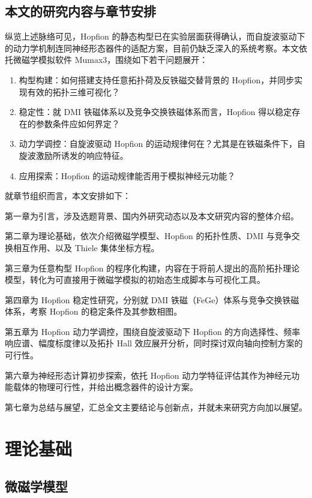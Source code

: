 \documentclass{article}
\begin{document}
\section{本文的研究内容与章节安排}

纵览上述脉络可见，Hopfion 的静态构型已在实验层面获得确认，而自旋波驱动下的动力学机制连同神经形态器件的适配方案，目前仍缺乏深入的系统考察。本文依托微磁学模拟软件 Mumax3，围绕如下若干问题展开：

\begin{enumerate}[label=(\arabic*)]
  \item 构型构建：如何搭建支持任意拓扑荷及反铁磁交替背景的 Hopfion，并同步实现有效的拓扑三维可视化？
  \item 稳定性：就 DMI 铁磁体系以及竞争交换铁磁体系而言，Hopfion 得以稳定存在的参数条件应如何界定？
  \item 动力学调控：自旋波驱动 Hopfion 的运动规律何在？尤其是在铁磁条件下，自旋波激励所诱发的响应特征。
  \item 应用探索：Hopfion 的运动规律能否用于模拟神经元功能？
\end{enumerate}

就章节组织而言，本文安排如下：

第一章为引言，涉及选题背景、国内外研究动态以及本文研究内容的整体介绍。

第二章为理论基础，依次介绍微磁学模型、Hopfion 的拓扑性质、DMI 与竞争交换相互作用、以及 Thiele 集体坐标方程。

第三章为任意构型 Hopfion 的程序化构建，内容在于将前人提出的高阶拓扑理论模型，转化为可直接用于微磁学模拟的初始态生成脚本与可视化工具。

第四章为 Hopfion 稳定性研究，分别就 DMI 铁磁（FeGe）体系与竞争交换铁磁体系，考察 Hopfion 的稳定条件及其参数相图。

第五章为 Hopfion 动力学调控，围绕自旋波驱动下 Hopfion 的方向选择性、频率响应谱、幅度标度律以及拓扑 Hall 效应展开分析，同时探讨双向轴向控制方案的可行性。

第六章为神经形态计算初步探索，依托 Hopfion 动力学特征评估其作为神经元功能载体的物理可行性，并给出概念器件的设计方案。

第七章为总结与展望，汇总全文主要结论与创新点，并就未来研究方向加以展望。

\chapter{理论基础}

\section{微磁学模型}
\end{document}
